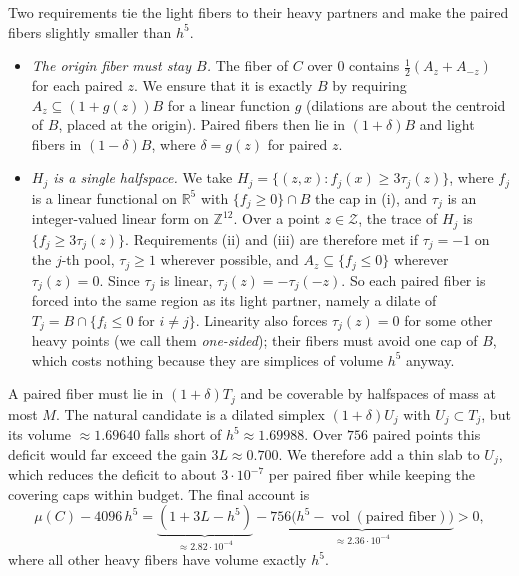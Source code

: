 \documentclass[11pt]{article}
\makeatletter
\renewcommand\paragraph{\@startsection{paragraph}{4}{\z@}{1.6ex \@plus .5ex \@minus .2ex}{-1em}{\normalfont\normalsize\bfseries}}
\newcommand{\R}{\mathbb{R}}
\newcommand{\Z}{\mathbb{Z}}
\newcommand{\Zcal}{\mathcal{Z}}
\newcommand{\1}{\mathbf{1}}
\DeclareMathOperator{\vol}{vol}
\makeatother
\begin{document}
\paragraph{The price.}
Two requirements tie the light fibers to their heavy partners and make the paired fibers slightly smaller than $h^5$.
\begin{itemize}
\item \emph{The origin fiber must stay $B$.} The fiber of $C$ over $0$ contains $\frac12(A_z+A_{-z})$ for each paired $z$.
We ensure that it is exactly $B$ by requiring $A_z\subseteq(1+g(z))B$ for a linear function $g$ (dilations are about the
centroid of $B$, placed at the origin). Paired fibers then lie in $(1+\delta)B$ and light fibers in $(1-\delta)B$, where
$\delta=g(z)$ for paired $z$.
\item \emph{$H_j$ is a single halfspace.} We take $H_j=\{(z,x):f_j(x)\ge3\tau_j(z)\}$, where $f_j$ is a linear functional
on $\R^5$ with $\{f_j\ge0\}\cap B$ the cap in (i), and $\tau_j$ is an integer-valued linear form on $\Z^{12}$. Over a point
$z\in\Zcal$, the trace of $H_j$ is $\{f_j\ge3\tau_j(z)\}$. Requirements (ii) and (iii) are therefore met if $\tau_j=-1$ on
the $j$-th pool, $\tau_j\ge1$ wherever possible, and $A_z\subseteq\{f_j\le0\}$ wherever $\tau_j(z)=0$. Since $\tau_j$ is
linear, $\tau_j(z)=-\tau_j(-z)$. So each paired fiber is forced into the same region as its light partner, namely a dilate
of $T_j=B\cap\{f_i\le0\text{ for }i\ne j\}$. Linearity also forces $\tau_j(z)=0$ for some other heavy points (we call them
\emph{one-sided}); their fibers must avoid one cap of $B$, which costs nothing because they are simplices of volume $h^5$
anyway.
\end{itemize}
A paired fiber must lie in $(1+\delta)T_j$ and be coverable by halfspaces of mass at most $M$. The natural candidate is a
dilated simplex $(1+\delta)U_j$ with $U_j\subset T_j$, but its volume $\approx1.69640$ falls short of $h^5\approx1.69988$.
Over $756$ paired points this deficit would far exceed the gain $3L\approx0.700$. We therefore add a thin slab to $U_j$,
which reduces the deficit to about $3\cdot10^{-7}$ per paired fiber while keeping the covering caps within budget. The final
account is
\begin{equation}\label{eq:account}
\mu(C)-4096\,h^5=\underbrace{(1+3L-h^5)}_{\approx2.82\cdot10^{-4}}
-\underbrace{756\bigl(h^5-\vol(\text{paired fiber})\bigr)}_{\approx2.36\cdot10^{-4}}>0,
\end{equation}
where all other heavy fibers have volume exactly $h^5$.
\end{document}
